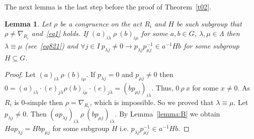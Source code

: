 \documentclass{birkau}
\numberwithin{equation}{section}
\theoremstyle{plain}
\newtheorem{lemma}[theorem]{Lemma}
\theoremstyle{definition}
\begin{document}
	The next lemma is the last step before the proof of Theorem~\ref{t02}.
	
	\begin{lemma} \label{lemma:C}
	    Let $\rho$ be a congruence on the act $R_i$ and $H$ be such subgroup that $\rho \neq \nabla_{R_i}$ and~\eqref{eq1} holds. If $(a)_{i \lambda} \ \rho \ (b)_{i \mu}$ for some $a,b \in G$, $\lambda,\mu \in \Lambda $ then $\lambda \equiv \mu$ (see~\eqref{eq821}) and $\forall j \in I \ p_{\lambda j} \neq 0 \rightarrow p_{\lambda j} p_{\mu j}^{-1} \in a^{-1}Hb$ for some subgroup $H \subseteq G$.
	\end{lemma}
	\begin{proof}
	    Let $(a)_{i \lambda} \ \rho \ (b)_{i \mu}$. If $p_{\lambda j} = 0$ and $p_{\mu j} \neq 0$ then $0 = (a)_{i \lambda} \cdot (e)_{j \lambda} \rho (b)_{i \mu} \cdot (e)_{j \lambda} = (bp_{\mu j})_{i \lambda}$. Thus, $0 \ \rho \ x$ for some $x \neq 0$. As $R_i$ is 0-simple then $\rho = \nabla_{R_i}$, which is impossible. So we proved that $\lambda \equiv \mu$. Let $p_{\lambda j} \neq 0$. Then $(ap_{\lambda j})_{i \lambda} \ \rho \ (bp_{\mu j})_{i \lambda}.$ By Lemma~\ref{lemma:B} we obtain $Hap_{\lambda j} = Hbp_{\mu j}$ for some subgroup $H$ i.e. $p_{\lambda j} p_{\mu j}^{-1} \in a^{-1}Hb$.
	\end{proof}
	
\end{document}
